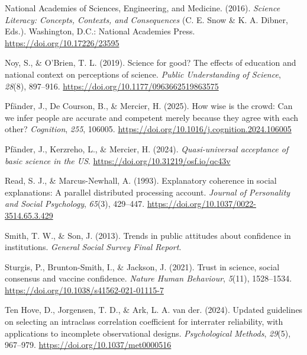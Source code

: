 \documentclass[
  doc,floatsintext]{apa6}
\newlength{\cslhangindent}
\newenvironment{CSLReferences}[2] %
 {\begin{list}{}{%
  \setlength{\itemindent}{0pt}
  \setlength{\leftmargin}{0pt}
  \setlength{\parsep}{0pt}
  \ifodd #1
   \setlength{\leftmargin}{\cslhangindent}
   \setlength{\itemindent}{-1\cslhangindent}
  \fi
  \setlength{\itemsep}{#2\baselineskip}}}
 {\end{list}}
\begin{document}
\begin{CSLReferences}{1}{0}
National Academies of Sciences, Engineering, and Medicine. (2016). \emph{Science Literacy: Concepts, Contexts, and Consequences} (C. E. Snow \& K. A. Dibner, Eds.). Washington, D.C.: National Academies Press. \url{https://doi.org/10.17226/23595}

Noy, S., \& O'Brien, T. L. (2019). Science for good? The effects of education and national context on perceptions of science. \emph{Public Understanding of Science}, \emph{28}(8), 897--916. \url{https://doi.org/10.1177/0963662519863575}

Pfänder, J., De Courson, B., \& Mercier, H. (2025). How wise is the crowd: Can we infer people are accurate and competent merely because they agree with each other? \emph{Cognition}, \emph{255}, 106005. \url{https://doi.org/10.1016/j.cognition.2024.106005}

Pfänder, J., Kerzreho, L., \& Mercier, H. (2024). \emph{Quasi-universal acceptance of basic science in the US}. \url{https://doi.org/10.31219/osf.io/qc43v}

Read, S. J., \& Marcus-Newhall, A. (1993). Explanatory coherence in social explanations: A parallel distributed processing account. \emph{Journal of Personality and Social Psychology}, \emph{65}(3), 429--447. \url{https://doi.org/10.1037/0022-3514.65.3.429}

Smith, T. W., \& Son, J. (2013). Trends in public attitudes about confidence in institutions. \emph{General Social Survey Final Report}.

Sturgis, P., Brunton-Smith, I., \& Jackson, J. (2021). Trust in science, social consensus and vaccine confidence. \emph{Nature Human Behaviour}, \emph{5}(11), 1528--1534. \url{https://doi.org/10.1038/s41562-021-01115-7}

Ten Hove, D., Jorgensen, T. D., \& Ark, L. A. van der. (2024). Updated guidelines on selecting an intraclass correlation coefficient for interrater reliability, with applications to incomplete observational designs. \emph{Psychological Methods}, \emph{29}(5), 967--979. \url{https://doi.org/10.1037/met0000516}


\end{CSLReferences}
\end{document}
